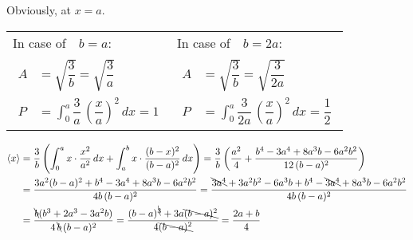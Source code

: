 {\color{hwSolution}
    Obviously, at $x=a$.
}


{\color{hwSolution}
\begin{center}\begin{tabularx}{\linewidth}{X|X}
    In case of~~$b=a$: & In case of~~$b=2a$:\\
    {\begin{align*}
        A &= \sqrt{\dfrac{3}{b}}
        = \sqrt{\dfrac{3}{a}}\\
        P &= \int_0^a \dfrac{3}{a} \,\left(\dfrac{x}{a}\right)^2\,dx
        = 1
    \end{align*}}
    &
    {\begin{align*}
        A &= \sqrt{\dfrac{3}{b}}
        = \sqrt{\dfrac{3}{2a}}\\
        P &= \int_0^a \dfrac{3}{2a} \,\left(\dfrac{x}{a}\right)^2\,dx
        = \dfrac{1}{2}
    \end{align*}}
\end{tabularx}\end{center}
}


{\color{hwSolution}
    \begin{align*}
        \left<x\right> &= \dfrac{3}{b}\left(
            \int_0^a x\cdot\dfrac{x^2}{a^2}\,dx
            +
            \int_a^b x\cdot\dfrac{(b-x)^2}{(b-a)^2}\,dx
            \right)
            = \dfrac{3}{b}\left(\dfrac{a^2}{4}+\dfrac{b^4-3a^4+8a^3b-6a^2b^2}{12\,(b-a)^2}\right)\\
            &= \dfrac{3a^2(b-a)^2+b^4-3a^4+8a^3b-6a^2b^2}{4b\,(b-a)^2}
            = \dfrac{\bcancel{3a^4}+3a^2b^2-6a^3b+b^4-\bcancel{3a^4}+8a^3b-6a^2b^2}{4b\,(b-a)^2}\\
            &= \dfrac{\bcancel{b}(b^3+2a^3-3a^2b)}{4\,\bcancel{b}\,(b-a)^2}
            = \dfrac{(b-a)^{\bcancel{3}}+3a\bcancel{(b-a)^2}}{4\bcancel{(b-a)^2}}
            = \dfrac{2a+b}{4}
    \end{align*}
}